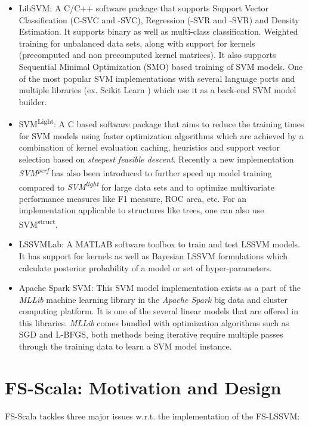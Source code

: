 \begin{itemize}
\item LibSVM: A C/C++ software package that supports Support Vector Classification (C-SVC and \textnu-SVC),  Regression (\textepsilon-SVR and \textnu-SVR) and Density Estimation. It supports binary as well as multi-class classification. Weighted training for unbalanced data sets, along with support for kernels (precomputed and non precomputed kernel matrices). It also supports Sequential Minimal Optimization (SMO) based training of SVM models. One of the most popular SVM implementations with several language ports and multiple libraries (ex. Scikit Learn \cite{scikit-learn}) which use it as a back-end SVM model builder. 

\item SVM\textsuperscript{Light}: A C based software package that aims to reduce the training times for SVM models using faster optimization algorithms which are achieved by a combination of kernel evaluation caching, heuristics and support vector selection based on \textit{steepest feasible descent}. Recently a new implementation \textit{SVM\textsuperscript{perf}} has also been introduced to further speed up model training compared to \textit{SVM\textsuperscript{light}} for large data sets and to optimize multivariate performance measures like F1 measure, ROC area, etc. For an implementation applicable to structures like trees, one can also use SVM\textsuperscript{struct}. 


\item LSSVMLab: A MATLAB software toolbox to train and test LSSVM models. It has support for kernels as well as Bayesian LSSVM formulations which calculate posterior probability of a model or set of hyper-parameters.

\item Apache Spark SVM: This SVM model implementation exists as a part of the \textit{MLLib} machine learning library in the \textit{Apache Spark} big data and cluster computing platform. It is one of the several linear models that are offered in this libraries. \textit{MLLib} comes bundled with optimization algorithms such as SGD and L-BFGS, both methods being iterative require multiple passes through the training data to learn a SVM model instance.

\end{itemize}

\section{FS-Scala: Motivation and Design}
FS-Scala tackles three major issues w.r.t. the implementation of the FS-LSSVM:

